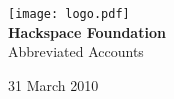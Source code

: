 


\begin{titlepage}
\begin{center}
\texttt{[image: logo.pdf]}\\[48pt]
{\bf \LARGE Hackspace Foundation}\\[36pt]
{\Large Abbreviated Accounts}

\vfill
31 March 2010

\end{center}
\end{titlepage}





